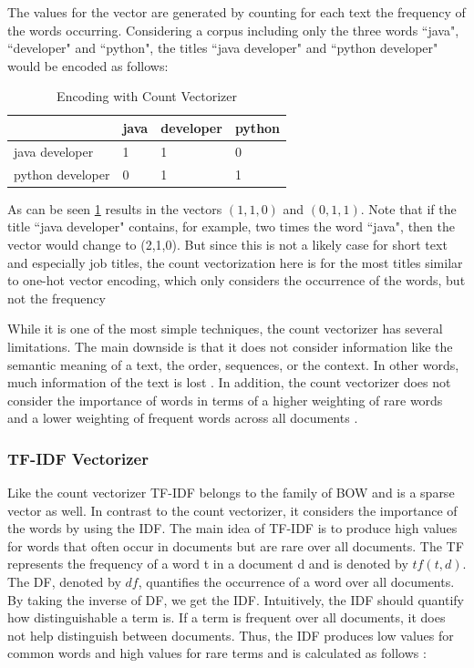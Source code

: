 \documentclass[12pt, a4paper, titlepage]{article}
\begin{document}
The values for the vector are generated by counting for each text the frequency of the words occurring. Considering a corpus including only the three words ``java", ``developer" and ``python", the titles ``java developer" and ``python developer" would be encoded as follows:


\begin{table}[hb!]
\center
  \begin{tabular}{llll}
  \hline
                   & java & developer & python \\ \hline
  java developer   & 1    & 1         & 0      \\
  python developer & 0    & 1         & 1      \\ \hline
  \end{tabular}
  \caption{\label{tab: T11} Encoding with Count Vectorizer}
  \end{table}


As can be seen \ref{tab: T11} results in the vectors $(1,1,0)$ and $(0,1,1)$. Note that if the title ``java developer" contains, for example, two times the word ``java", then the vector would change to (2,1,0). But since this is not a likely case for short text and especially job titles, the count vectorization here is for the most titles similar to one-hot vector encoding, which only considers the occurrence of the words, but not the frequency \citep{kulkarni2021, sarkar2016}

  While it is one of the most simple techniques, the count vectorizer has several limitations. The main downside is that it does not consider information like the semantic meaning of a text, the order, sequences, or the context. In other words, much information of the text is lost \citep{sarkar2016}. In addition, the count vectorizer does not consider the importance of words in terms of a higher weighting of rare words and a lower weighting of frequent words across all documents \citep{suleymanov2019}.

\subsubsection*{TF-IDF Vectorizer}
Like the count vectorizer \ac{TF-IDF} belongs to the family of \ac{BOW} and is a sparse vector as well. In contrast to the count vectorizer, it considers the importance of the words by using the \ac{IDF}. The main idea of \ac{TF-IDF} is to produce high values for words that often occur in documents but are rare over all documents. The \ac{TF} represents the frequency of a word t in a document d and is denoted by $tf(t,d)$. The \ac{DF}, denoted by $df$, quantifies the occurrence of a word over all documents. By taking the inverse of \ac{DF}, we get the \ac{IDF}. Intuitively, the \ac{IDF} should quantify how distinguishable a term is. If a term is frequent over all documents, it does not help distinguish between documents. Thus, the \ac{IDF} produces low values for common words and high values for rare terms and is calculated as follows \citep{sidorov2019, kuang2010}: 
\end{document}

